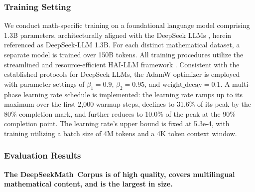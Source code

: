 \begin{itemize}[topsep=0pt]
\subsubsection{Training Setting}
\label{sec:quality-policy}
We conduct math-specific training on a foundational language model comprising 1.3B parameters, architecturally aligned with the DeepSeek LLMs \citep{deepseek-llm}, herein referenced as DeepSeek-LLM 1.3B. For each distinct mathematical dataset, a separate model is trained over 150B tokens. All training procedures utilize the streamlined and resource-efficient HAI-LLM framework \citep{haillm}. Consistent with the established protocols for DeepSeek LLMs, the AdamW optimizer \citep{adamW} is employed with parameter settings of $\beta_1=0.9$, $\beta_2=0.95$, and $\mathrm{weight\_decay}=0.1$. A multi-phase learning rate schedule is implemented: the learning rate ramps up to its maximum over the first 2,000 warmup steps, declines to 31.6\% of its peak by the 80\% completion mark, and further reduces to 10.0\% of the peak at the 90\% completion point. The learning rate’s upper bound is fixed at 5.3e-4, with training utilizing a batch size of 4M tokens and a 4K token context window.

\subsubsection{Evaluation Results}

\textbf{The DeepSeekMath~Corpus is of high quality, covers multilingual mathematical content, and is the largest in size.}


\end{itemize}
